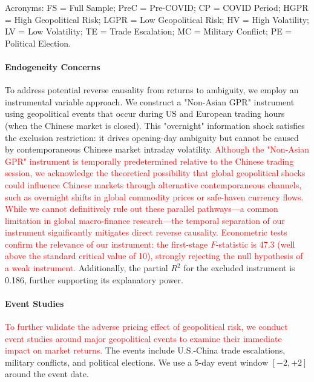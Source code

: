 \documentclass[preprint,12pt,authoryear]{elsarticle}
\begin{document}
\begin{table}[htbp]
\begin{threeparttable}
\begin{tablenotes}[flushleft]
\item[] Acronyms: FS = Full Sample; PreC = Pre-COVID; CP = COVID Period; HGPR = High Geopolitical Risk; LGPR = Low Geopolitical Risk; HV = High Volatility; LV = Low Volatility; TE = Trade Escalation; MC = Military Conflict; PE = Political Election.
\end{tablenotes}
\end{threeparttable}
\end{table}

\paragraph{Endogeneity Concerns} To address potential reverse causality from returns to ambiguity, we employ an instrumental variable approach. We construct a "Non-Asian GPR" instrument using geopolitical events that occur during US and European trading hours (when the Chinese market is closed). This "overnight" information shock satisfies the exclusion restriction: it drives opening-day ambiguity but cannot be caused by contemporaneous Chinese market intraday volatility. \textcolor{red}{Although the "Non-Asian GPR" instrument is temporally predetermined relative to the Chinese trading session, we acknowledge the theoretical possibility that global geopolitical shocks could influence Chinese markets through alternative contemporaneous channels, such as overnight shifts in global commodity prices or safe-haven currency flows. While we cannot definitively rule out these parallel pathways—a common limitation in global macro-finance research—the temporal separation of our instrument significantly mitigates direct reverse causality. Econometric tests confirm the relevance of our instrument: the first-stage $F$-statistic is 47.3 (well above the standard critical value of 10), strongly rejecting the null hypothesis of a weak instrument.} Additionally, the partial $R^2$ for the excluded instrument is 0.186, further supporting its explanatory power.


\paragraph{Event Studies} \textcolor{red}{To further validate the adverse pricing effect of geopolitical risk, we conduct event studies around major geopolitical events to examine their immediate impact on market returns.} The events include U.S.-China trade escalations, military conflicts, and political elections. We use a 5-day event window $[-2, +2]$ around the event date.
\end{document}
